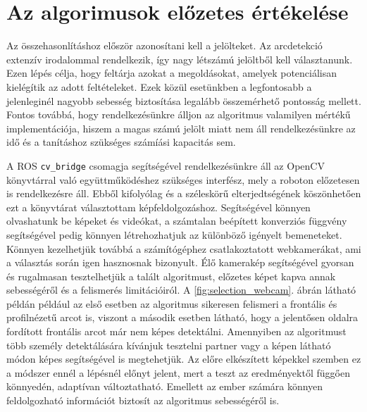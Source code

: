 \section{Az algorimusok előzetes értékelése}
Az összehasonlításhoz először azonosítani kell a jelölteket. Az arcdetekció extenzív irodalommal rendelkezik, így nagy létszámú jelöltből kell választanunk. Ezen lépés célja, hogy feltárja azokat a megoldásokat, amelyek potenciálisan kielégítik az adott feltételeket. Ezek közül esetünkben a legfontosabb a jelenleginél nagyobb sebesség biztosítása legalább összemérhető pontosság mellett. Fontos továbbá, hogy rendelkezésünkre álljon az algoritmus valamilyen mértékű implementációja, hiszem a magas számú jelölt miatt nem áll rendelkezésünkre az idő és a tanításhoz szükséges számíási kapacitás sem.

A ROS \lstinline{cv_bridge} csomagja segítségével rendelkezésünkre áll az OpenCV\cite{noauthor_opencvopencv_2021} könyvtárral való együttműködéshez szükséges interfész, mely a roboton előzetesen is rendelkezésre áll. Ebből kifolyólag és a széleskörű elterjedtségének köszönhetően ezt a könyvtárat választottam képfeldolgozáshoz. Segítségével könnyen olvashatunk be képeket és videókat, a számtalan beépített konverziós függvény segítségével pedig könnyen létrehozhatjuk az különböző igényelt bemeneteket. Könnyen kezelhetjük továbbá a számítógéphez csatlakoztatott webkamerákat, ami a választás során igen hasznosnak bizonyult. Élő kamerakép segítségével gyorsan és rugalmasan tesztelhetjük a talált algoritmust, előzetes képet kapva annak sebességéről és a felismerés limitációiról. A \ref{fig:selection_webcam}. ábrán látható példán például az első esetben az algoritmus sikeresen felismeri a frontális és profilnézetű arcot is, viszont a második esetben látható, hogy a jelentősen oldalra fordított frontális arcot már nem képes detektálni. Amennyiben az algoritmust több személy detektálására kívánjuk tesztelni partner vagy a képen látható módon képes segítségével is megtehetjük. Az előre elkészített képekkel szemben ez a módszer ennél a lépésnél előnyt jelent, mert a teszt az eredményektől függően könnyedén, adaptívan változtatható. Emellett az ember számára könnyen feldolgozható információt biztosít az algoritmus sebességéről is.


